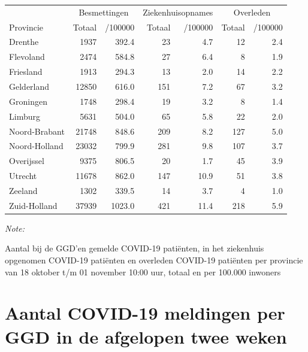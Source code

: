 \documentclass[
  english,
  man,floatsintext]{apa6}
\begin{document}
\begin{table}[H]
\centering
\begin{threeparttable}
\begin{tabular}{lrrrrrr}
\toprule
\multicolumn{1}{c}{ } & \multicolumn{2}{c}{Besmettingen} & \multicolumn{2}{c}{Ziekenhuisopnames} & \multicolumn{2}{c}{Overleden} \\
\cmidrule(l{3pt}r{3pt}){2-3} \cmidrule(l{3pt}r{3pt}){4-5} \cmidrule(l{3pt}r{3pt}){6-7}
Provincie & Totaal & /100000 & Totaal & /100000 & Totaal & /100000\\
\midrule
Drenthe & 1937 & 392.4 & 23 & 4.7 & 12 & 2.4\\
Flevoland & 2474 & 584.8 & 27 & 6.4 & 8 & 1.9\\
Friesland & 1913 & 294.3 & 13 & 2.0 & 14 & 2.2\\
Gelderland & 12850 & 616.0 & 151 & 7.2 & 67 & 3.2\\
Groningen & 1748 & 298.4 & 19 & 3.2 & 8 & 1.4\\
Limburg & 5631 & 504.0 & 65 & 5.8 & 22 & 2.0\\
Noord-Brabant & 21748 & 848.6 & 209 & 8.2 & 127 & 5.0\\
Noord-Holland & 23032 & 799.9 & 281 & 9.8 & 107 & 3.7\\
Overijssel & 9375 & 806.5 & 20 & 1.7 & 45 & 3.9\\
Utrecht & 11678 & 862.0 & 147 & 10.9 & 51 & 3.8\\
Zeeland & 1302 & 339.5 & 14 & 3.7 & 4 & 1.0\\
Zuid-Holland & 37939 & 1023.0 & 421 & 11.4 & 218 & 5.9\\
\bottomrule
\end{tabular}
\begin{tablenotes}
\item \textit{Note: } 
\item Aantal bij de GGD’en gemelde COVID-19 patiënten, in het ziekenhuis opgenomen COVID-19 patiënten en overleden COVID-19 patiënten per provincie van 18 oktober t/m 01 november 10:00 uur, totaal en per 100.000 inwoners
\end{tablenotes}
\end{threeparttable}
\end{table}

\newpage

\hypertarget{aantal-covid-19-meldingen-per-ggd-in-de-afgelopen-twee-weken}{%
\section{Aantal COVID-19 meldingen per GGD in de afgelopen twee weken}\label{aantal-covid-19-meldingen-per-ggd-in-de-afgelopen-twee-weken}}
\end{document}
